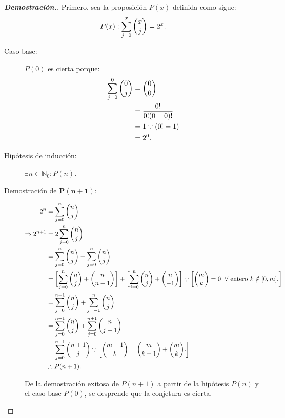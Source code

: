 \documentclass{article}
\theoremstyle{definition}
\begin{document}
\begin{proof}[\textbf{{Demostración.}}]
Primero, sea la proposición $P(x)$ definida como sigue: 
$$P(x):\displaystyle \sum_{j=0}^{x} \displaystyle \binom{x}{j} = 2^{x}.$$
\begin{description}
\item[Caso base:] $P(0)$ es cierta porque:
\begin{align*}
\displaystyle \sum_{j=0}^{0} \displaystyle \binom{0}{j} &= \displaystyle \binom{0}{0} \\
&= \dfrac{0!}{0!(0-0)!}\\ &= 1 \because (0!=1)\\ &= 2^{0}.
\end{align*}
\item[Hipótesis de inducción:] $\exists n \in \mathbb{N}_{0} : P(n).$
\item[Demostración de $\mathbf{P(n+1)}$:] 
\begin{align*}
2^{n}  &= \displaystyle \sum_{j=0}^{n} \displaystyle \binom{n}{j} \\
\Rightarrow 2^{n+1} &= 2\sum_{j=0}^{n} \displaystyle \binom{n}{j} \\
&= \sum_{j=0}^{n} \displaystyle \binom{n}{j} + \sum_{j=0}^{n} \displaystyle \binom{n}{j}\\
&= \biggl[\sum_{j=0}^{n} \displaystyle \binom{n}{j} + \displaystyle \binom{n}{n+1}\biggr] + \biggl[\sum_{j=0}^{n} \displaystyle \binom{n}{j} + \displaystyle \binom{n}{-1}\biggr]  \because \biggl[\displaystyle\binom{m}{k}=0  \; \;  \forall \textnormal{ entero } k \notin [0,m].\biggr]\\
&= \sum_{j=0}^{n+1} \displaystyle \binom{n}{j} + \sum_{j=-1}^{n} \displaystyle \binom{n}{j} \\
&= \sum_{j=0}^{n+1} \displaystyle \binom{n}{j} + \sum_{j=0}^{n+1} \displaystyle \binom{n}{j-1}\\
&= \sum_{j=0}^{n+1} \displaystyle \binom{n+1}{j} \because \biggl[\displaystyle\binom{m+1}{k}=\displaystyle\binom{m}{k-1}+\displaystyle\binom{m}{k}.\biggr] \\
&\therefore P(n+1).
\end{align*}

De la demostración exitosa de $P(n+1)$ a partir de la hipótesis $P(n)$ y el caso base $P(0)$, se desprende que la conjetura es cierta.
\end{description}
\end{proof}
\paragraph{}
\paragraph{}
\end{document}
